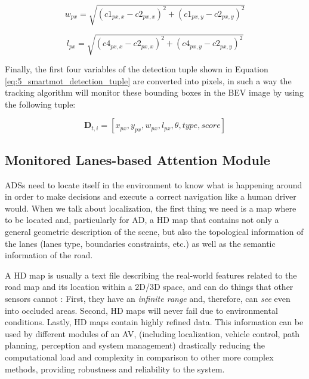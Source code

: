 \begin{equation}
\label{widthpixels}
w_{px} = \sqrt{(c1_{px,x}-c2_{px,x})^2 + (c1_{px,y}-c2_{px,y})^2}
\end{equation}

\begin{equation}
\label{lengthpixels}
l_{px} = \sqrt{(c4_{px,x}-c2_{px,x})^2 + (c4_{px,y}-c2_{px,y})^2}
\end{equation}

Finally, the first four variables of the detection tuple shown in Equation \ref{eq:5_smartmot_detection_tuple} are converted into pixels, in such a way the tracking algorithm will monitor these bounding boxes in the BEV image by using the following tuple:

\begin{equation}
	\label{detpx}
	\textbf{D}_{t,i} = [x_{px},y_{px},w_{px},l_{px},\theta,type,score]
\end{equation}

\subsection{Monitored Lanes-based Attention Module}
\label{subsec:4_smartmot_mlam}

\acp{ADS} need to locate itself in the environment to know what is happening around in order to make decisions and execute a correct navigation like a human driver would. When we talk about localization, the first thing we need is a map where to be located and, particularly for \ac{AD}, a HD map that contains not only a general geometric description of the scene, but also the topological information of the lanes (lanes type, boundaries constraints, etc.) as well as the semantic information of the road. 

A HD map is usually a text file describing the real-world features related to the road map and its location within a 2D/3D space, and can do things that other sensors cannot \cite{wong2020mapping}: First, they have an \textit{infinite range} and, therefore, can \textit{see} even into occluded areas. Second, HD maps will never fail due to environmental conditions. Lastly, HD maps contain highly refined data. This information can be used by different modules of an AV, (including localization, vehicle control, path planning, perception and system management) drastically reducing the computational load and complexity in comparison to other more complex methods, providing robustness and reliability to the system.

